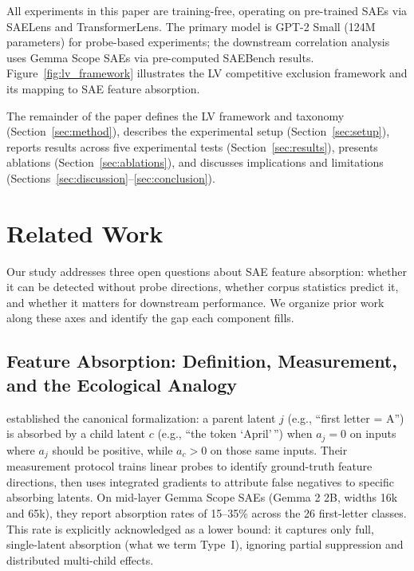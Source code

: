 \documentclass{article}
\begin{document}
All experiments in this paper are training-free, operating on pre-trained SAEs via SAELens and TransformerLens. The primary model is GPT-2 Small (124M parameters) for probe-based experiments; the downstream correlation analysis uses Gemma Scope SAEs via pre-computed SAEBench results. Figure~\ref{fig:lv_framework} illustrates the LV competitive exclusion framework and its mapping to SAE feature absorption.

The remainder of the paper defines the LV framework and taxonomy (Section~\ref{sec:method}), describes the experimental setup (Section~\ref{sec:setup}), reports results across five experimental tests (Section~\ref{sec:results}), presents ablations (Section~\ref{sec:ablations}), and discusses implications and limitations (Sections~\ref{sec:discussion}--\ref{sec:conclusion}).


\section{Related Work}
\label{sec:related}

Our study addresses three open questions about SAE feature absorption: whether it can be detected without probe directions, whether corpus statistics predict it, and whether it matters for downstream performance. We organize prior work along these axes and identify the gap each component fills.

\subsection{Feature Absorption: Definition, Measurement, and the Ecological Analogy}

\citet{chanin2024absorption} established the canonical formalization: a parent latent $j$ (e.g., ``first letter = A'') is absorbed by a child latent $c$ (e.g., ``the token `April'\,'') when $a_j = 0$ on inputs where $a_j$ should be positive, while $a_c > 0$ on those same inputs. Their measurement protocol trains linear probes to identify ground-truth feature directions, then uses integrated gradients to attribute false negatives to specific absorbing latents. On mid-layer Gemma Scope SAEs (Gemma 2 2B, widths 16k and 65k), they report absorption rates of 15--35\% across the 26 first-letter classes. This rate is explicitly acknowledged as a lower bound: it captures only full, single-latent absorption (what we term Type~I), ignoring partial suppression and distributed multi-child effects.
\end{document}
